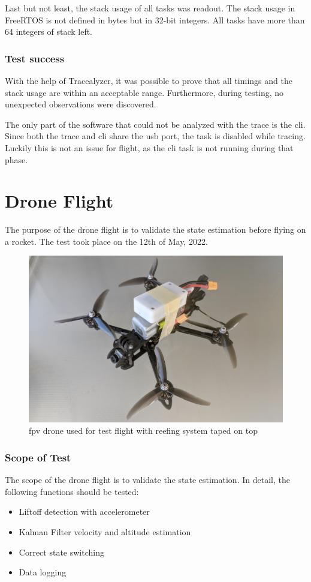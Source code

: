 Last but not least, the stack usage of all tasks was readout. The stack usage in FreeRTOS is not defined in bytes but in 32-bit integers. All tasks have more than 64 integers of stack left.


\subsubsection{Test success}
With the help of Tracealyzer, it was possible to prove that all timings and the stack usage are within an acceptable range. Furthermore, during testing, no unexpected observations were discovered.

The only part of the software that could not be analyzed with the trace is the \acrshort{cli}. Since both the trace and \acrshort{cli} share the \acrshort{usb} port, the task is disabled while tracing. Luckily this is not an issue for flight, as the \acrshort{cli} task is not running during that phase.

\newpage

\section{Drone Flight}
The purpose of the drone flight is to validate the state estimation before flying on a rocket. The test took place on the 12th of May, 2022. 

\begin{figure}[h!]
	\centering
	\includegraphics[width=\textwidth]{images/fpv}
	\caption{\acrshort{fpv} drone used for test flight with reefing system taped on top}
	\label{fig:fpv-drone}
\end{figure}

\subsubsection{Scope of Test}
The scope of the drone flight is to validate the state estimation. In detail, the following functions should be tested:
\begin{itemize}
    \item Liftoff detection with accelerometer
    \item Kalman Filter velocity and altitude estimation
    \item Correct state switching
    \item Data logging
\end{itemize}

